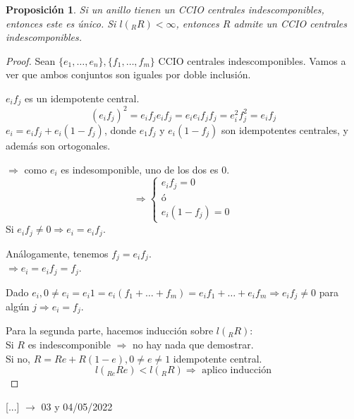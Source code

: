 \documentclass[11pt,a4paper]{article}
\theoremstyle{break}
\newtheorem{proposition}[theorem]{Proposición}
\begin{document}
\begin{proposition}
Si un anillo tienen un CCIO centrales indescomponibles, entonces este es único. Si $l(_{R}R) < \infty$, entonces $R$ admite un CCIO centrales indescomponibles.
\end{proposition}

\begin{proof}
Sean $\{e_{1}, \dots, e_{n}\}, \{f_{1}, \dots, f_{m}\}$ CCIO centrales indescomponibles. Vamos a ver que ambos conjuntos son iguales por doble inclusión.

$e_{i}f_{j}$ es un idempotente central.
$$(e_{i}f_{j})^{2} = e_{i}f_{j}e_{i}f_{j} = e_{i}e_{i}f_{j}f_{j} = e_{i}^{2}f_{j}^{2} = e_{i}f_{j}$$
$e_{i} = e_{i}f_{j} + e_{i}(1-f_{j})$, donde $e_{1}f_{j}$ y $e_{i}(1-f_{j})$ son idempotentes centrales, y además son ortogonales.

$\Rightarrow$ como $e_{i}$ es indesomponible, uno de los dos es $0$.
$$\Rightarrow \begin{cases}
e_{i}f_{j} = 0 \\
\text{ó} \\
e_{i}(1-f_{j}) = 0
\end{cases}$$
Si $e_{i}f_{j} \neq 0 \Rightarrow e_{i} = e_{i}f_{j}$.

Análogamente, tenemos $f_{j} = e_{i}f_{j}$. \\
$\Rightarrow e_{i} = e_{i}f_{j} = f_{j}$.

Dado $e_{i}, 0 \neq e_{i} = e_{i}1 = e_{i}(f_{1} + \dots + f_{m}) = e_{i}f_{1} + \dots + e_{i}f_{m} \Rightarrow e_{i}f_{j} \neq 0$ para algún $j \Rightarrow e_{i} = f_{j}$.

Para la segunda parte, hacemos inducción sobre $l(_{R}R)$: \\
Si $R$ es indescomponible $\Rightarrow$ no hay nada que demostrar. \\
Si no, $R = Re + R(1-e), 0 \neq e \neq 1$ idempotente central.
$$l(_{Re}Re) < l(_{R}R) \Rightarrow \text{ aplico inducción}$$
\end{proof}

[...] $\to$ 03 y 04/05/2022

\end{document}
